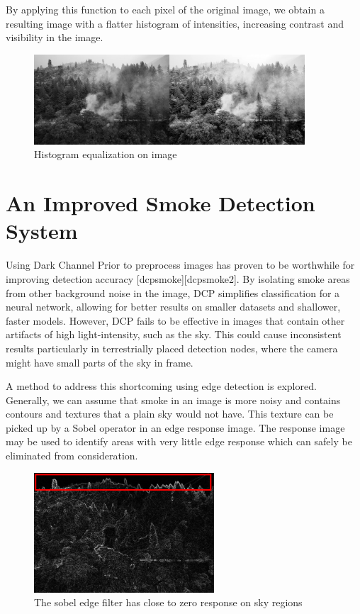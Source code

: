 By applying this function to each pixel of the original image, we obtain
a resulting image with a flatter histogram of intensities, increasing
contrast and visibility in the image.

\begin{figure}
\centering
\includegraphics[width=0.9\textwidth,height=\textheight]{firehe.png}
\caption{Histogram equalization on image}
\end{figure}

\label{firehe}{}

\section{An Improved Smoke Detection System}

Using Dark Channel Prior to preprocess images has proven to be
worthwhile for improving detection accuracy
{[}dcpsmoke{]}{[}dcpsmoke2{]}. By isolating smoke areas from other
background noise in the image, DCP simplifies classification for a
neural network, allowing for better results on smaller datasets and
shallower, faster models. However, DCP fails to be effective in images
that contain other artifacts of high light-intensity, such as the sky.
This could cause inconsistent results particularly in terrestrially
placed detection nodes, where the camera might have small parts of the
sky in frame.

A method to address this shortcoming using edge detection is explored.
Generally, we can assume that smoke in an image is more noisy and
contains contours and textures that a plain sky would not have. This
texture can be picked up by a Sobel operator in an edge response image.
The response image may be used to identify areas with very little edge
response which can safely be eliminated from consideration.

\begin{figure}
\centering
\includegraphics[width=0.6\textwidth,height=\textheight]{sobelsky.png}
\caption{The sobel edge filter has close to zero response on sky
regions}
\end{figure}

